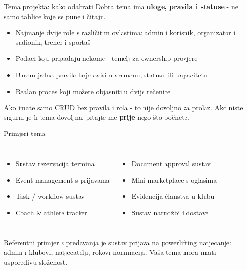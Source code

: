 \begin{frame}{Tema projekta: kako odabrati}
Dobra tema ima \textbf{uloge, pravila i statuse} - ne samo tablice koje se pune i čitaju.

\vspace{0.4em}
\begin{itemize}
  \item Najmanje dvije role s različitim ovlastima: admin i korisnik, organizator i sudionik, trener i sportaš
  \item Podaci koji pripadaju nekome - temelj za ownership provjere
  \item Barem jedno pravilo koje ovisi o vremenu, statusu ili kapacitetu
  \item Realan proces koji možete objasniti u dvije rečenice
\end{itemize}

\vspace{0.6em}
Ako imate samo CRUD bez pravila i rola - to nije dovoljno za prolaz. Ako niste sigurni je li tema dovoljna, pitajte me \textbf{prije} nego što počnete.
\end{frame}

\begin{frame}{Primjeri tema}
\begin{columns}[T]
\begin{itemize}
  \item Sustav rezervacija termina
  \item Event management s prijavama
  \item Task / workflow sustav
  \item Coach \& athlete tracker
\end{itemize}

\begin{itemize}
  \item Document approval sustav
  \item Mini marketplace s oglasima
  \item Evidencija članstva u klubu
  \item Sustav narudžbi i dostave
\end{itemize}
\end{columns}

\vspace{0.6em}
Referentni primjer s predavanja je sustav prijava na powerlifting natjecanje: admin i klubovi, natjecatelji, rokovi nominacija. Vaša tema mora imati usporedivu složenost.
\end{frame}

